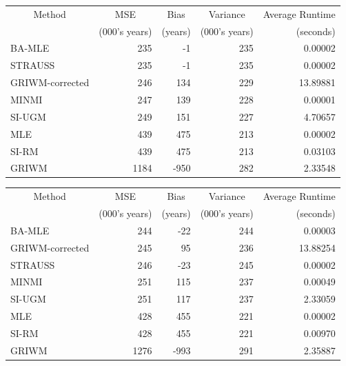 \documentclass[
]{article}
\begin{document}
\begin{tabular}{lrrrr}
\toprule
\multicolumn{1}{c}{Method} & \multicolumn{1}{c}{MSE} & \multicolumn{1}{c}{Bias} & \multicolumn{1}{c}{Variance} & \multicolumn{1}{c}{Average Runtime} \\
\cmidrule(l{3pt}r{3pt}){1-1} \cmidrule(l{3pt}r{3pt}){2-2} \cmidrule(l{3pt}r{3pt}){3-3} \cmidrule(l{3pt}r{3pt}){4-4} \cmidrule(l{3pt}r{3pt}){5-5}
 & (000's years) & (years) & (000's years) & (seconds)\\
\midrule
BA-MLE & 235 & -1 & 235 & 0.00002\\
STRAUSS & 235 & -1 & 235 & 0.00002\\
GRIWM-corrected & 246 & 134 & 229 & 13.89881\\
MINMI & 247 & 139 & 228 & 0.00001\\
SI-UGM & 249 & 151 & 227 & 4.70657\\
\addlinespace
MLE & 439 & 475 & 213 & 0.00002\\
SI-RM & 439 & 475 & 213 & 0.03103\\
GRIWM & 1184 & -950 & 282 & 2.33548\\
\bottomrule
\end{tabular}

\begin{tabular}{lrrrr}
\toprule
\multicolumn{1}{c}{Method} & \multicolumn{1}{c}{MSE} & \multicolumn{1}{c}{Bias} & \multicolumn{1}{c}{Variance} & \multicolumn{1}{c}{Average Runtime} \\
\cmidrule(l{3pt}r{3pt}){1-1} \cmidrule(l{3pt}r{3pt}){2-2} \cmidrule(l{3pt}r{3pt}){3-3} \cmidrule(l{3pt}r{3pt}){4-4} \cmidrule(l{3pt}r{3pt}){5-5}
 & (000's years) & (years) & (000's years) & (seconds)\\
\midrule
BA-MLE & 244 & -22 & 244 & 0.00003\\
GRIWM-corrected & 245 & 95 & 236 & 13.88254\\
STRAUSS & 246 & -23 & 245 & 0.00002\\
MINMI & 251 & 115 & 237 & 0.00049\\
SI-UGM & 251 & 117 & 237 & 2.33059\\
\addlinespace
MLE & 428 & 455 & 221 & 0.00002\\
SI-RM & 428 & 455 & 221 & 0.00970\\
GRIWM & 1276 & -993 & 291 & 2.35887\\
\bottomrule
\end{tabular}
\end{document}
